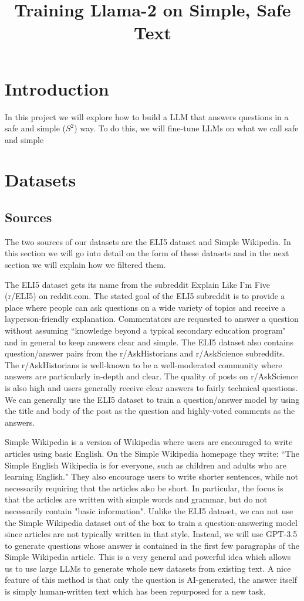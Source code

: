 \documentclass[11pt, oneside]{article}   	%
\title{Training Llama-2 on Simple, Safe Text}
\begin{document}
\maketitle
\section{Introduction}

In this project we will explore how to build a LLM that answers questions in a safe and simple ($S^{2}$) way.
To do this, we will fine-tune LLMs on what we call safe and simple 

\section{Datasets}
\subsection{Sources}
The two sources of our datasets are the ELI5 dataset and Simple Wikipedia.
In this section we will go into detail on the form of these datasets and in the next section we will explain how we filtered them. 

The ELI5 dataset gets its name from the subreddit Explain Like I'm Five (r/ELI5) on reddit.com.
The stated goal of the ELI5 subreddit is to provide a place where people can ask questions on a wide variety of topics and receive a layperson-friendly explanation.
Commentators are requested to answer a question without assuming ``knowledge beyond a typical secondary education program" and in general to keep answers clear and simple.
The ELI5 dataset also contains question/answer pairs from the r/AskHistorians and r/AskScience subreddits. The r/AskHistorians is well-known to be a well-moderated community where answers are particularly in-depth and clear. The quality of posts on r/AskScience is also high and users generally receive clear answers to fairly technical questions.
We can generally use the ELI5 dataset to train a question/answer model by using the title and body of the post as the question and highly-voted comments as the answers.

Simple Wikipedia is a version of Wikipedia where users are encouraged to write articles using basic English.
On the Simple Wikipedia homepage they write: ``The Simple English Wikipedia is for everyone, such as children and adults who are learning English."
They also encourage users to write shorter sentences, while not necessarily requiring that the articles also be short.
In particular, the focus is that the articles are written with simple words and grammar, but do not necessarily contain "basic information".
Unlike the ELI5 dataset, we can not use the Simple Wikipedia dataset out of the box to train a question-answering model since articles are not typically written in that style.
Instead, we will use GPT-3.5 to generate questions whose answer is contained in the first few paragraphs of the Simple Wikipedia article.
This is a very general and powerful idea which allows us to use large LLMs to generate whole new datasets from existing text.
A nice feature of this method is that only the question is AI-generated, the answer itself is simply human-written text which has been repurposed for a new task.
\end{document}
